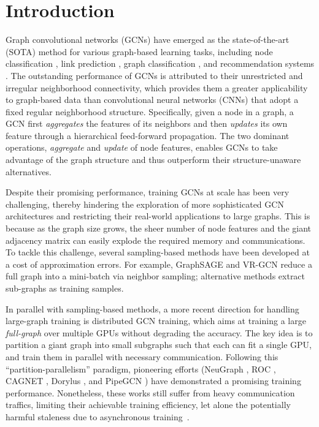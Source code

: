 \documentclass{article}
\begin{document}
\printAffiliationsAndNotice{\mlsysEqualContribution} 

\section{Introduction}

Graph convolutional networks (GCNs) \citep{kipf2016semi} have emerged as the state-of-the-art (SOTA) method for various graph-based learning tasks, including node classification \citep{kipf2016semi}, link prediction \citep{zhang2018link}, graph classification \citep{xu2018powerful}, and recommendation systems \citep{ying2018graph}.
The outstanding performance of GCNs is attributed to their unrestricted and irregular neighborhood connectivity, which provides them a greater applicability to graph-based data than convolutional neural networks (CNNs) that adopt a fixed regular neighborhood structure.
Specifically, given a node in a graph, a GCN first \textit{aggregates} the features of its neighbors and then \textit{updates} its own feature through a hierarchical feed-forward propagation. 
The two dominant operations, \textit{aggregate} and \textit{update} of node features, enables GCNs to take advantage of the graph structure and thus outperform their structure-unaware alternatives.


Despite their promising performance, training GCNs at scale has been very challenging, thereby hindering the exploration of more sophisticated GCN architectures and restricting their real-world applications to large graphs.
This is because as the graph size grows, the sheer number of node features and the giant adjacency matrix can easily explode the required memory and communications.
To tackle this challenge, several sampling-based methods have been developed at a cost of approximation errors. 
For example, GraphSAGE \citep{hamilton2017inductive} and VR-GCN \citep{chen2018stochastic} reduce a full graph into a mini-batch via neighbor sampling; alternative methods \citep{chiang2019cluster,zeng2019graphsaint} extract sub-graphs as training samples.

In parallel with sampling-based methods, a more recent direction for handling large-graph training is distributed GCN training, which aims at training a large \textit{full-graph} over multiple GPUs without degrading the accuracy. 
The key idea is to partition a giant graph into small subgraphs such that each can fit a single GPU, and train them in parallel with necessary communication.
Following this ``partition-parallelism'' paradigm, pioneering efforts (NeuGraph \citep{ma2019neugraph}, ROC \citep{jia2020improving}, CAGNET \citep{tripathy2020reducing}, Dorylus \citep{thorpe2021dorylus}, and PipeGCN \citep{wan2022pipegcn}) have demonstrated a promising training performance.
Nonetheless, these works still suffer from heavy communication traffics, 
limiting their achievable training efficiency, let alone the potentially harmful staleness due to asynchronous training~\citep{thorpe2021dorylus}.
\end{document}
